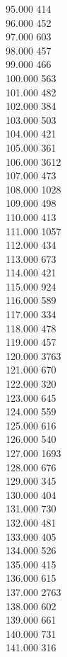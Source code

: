 { 95.000	414 \\
 96.000	452 \\
 97.000	603 \\
 98.000	457 \\
 99.000	466 \\
 100.000	563 \\
 101.000	482 \\
 102.000	384 \\
 103.000	503 \\
 104.000	421 \\
 105.000	361 \\
 106.000	3612 \\
 107.000	473 \\
 108.000	1028 \\
 109.000	498 \\
 110.000	413 \\
 111.000	1057 \\
 112.000	434 \\
 113.000	673 \\
 114.000	421 \\
 115.000	924 \\
 116.000	589 \\
 117.000	334 \\
 118.000	478 \\
 119.000	457 \\
 120.000	3763 \\
 121.000	670 \\
 122.000	320 \\
 123.000	645 \\
 124.000	559 \\
 125.000	616 \\
 126.000	540 \\
 127.000	1693 \\
 128.000	676 \\
 129.000	345 \\
 130.000	404 \\
 131.000	730 \\
 132.000	481 \\
 133.000	405 \\
 134.000	526 \\
 135.000	415 \\
 136.000	615 \\
 137.000	2763 \\
 138.000	602 \\
 139.000	661 \\
 140.000	731 \\
 141.000	316 \\
}
